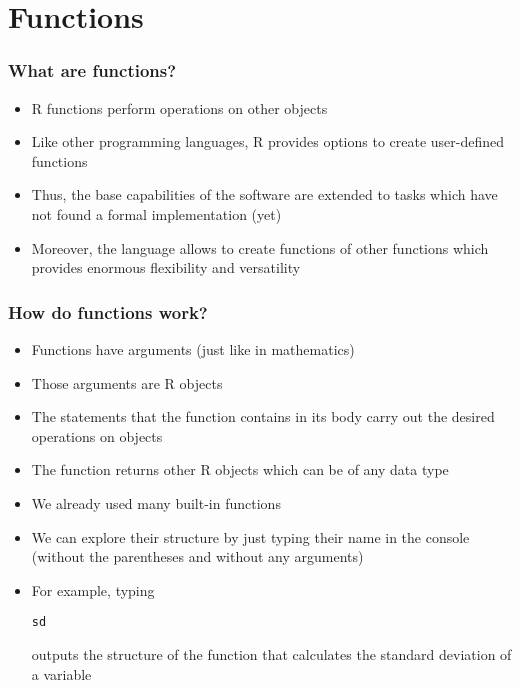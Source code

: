 \documentclass[10pt]{beamer}
\theoremstyle{definition}
\begin{document}
\section{Functions}
\begin{frame}[fragile]
\frametitle{What are functions?}
\begin{itemize}
	\item R functions perform operations on other objects
	\item Like other programming languages, R provides options to create user-defined functions
	\item Thus, the base capabilities of the software are extended to tasks which have not found a formal implementation (yet)
	\item Moreover, the language allows to create functions of other functions which provides enormous flexibility and versatility
\end{itemize}
\end{frame}

\begin{frame}[fragile]
\frametitle{How do functions work?}
\begin{itemize}
	\item Functions have arguments (just like in mathematics)
	\item Those arguments are R objects
	\item The statements that the function contains in its body carry out the desired operations on objects
	\item The function returns other R objects which can be of any data type
	\item We already used many built-in functions
	\item We can explore their structure by just typing their name in the console (without the parentheses and without any arguments)
	\item For example, typing
	\begin{lstlisting}[style = rstyle, breaklines]
	sd
	\end{lstlisting}
	outputs the structure of the function that calculates the standard deviation of a variable
\end{itemize}
\end{frame}
\end{document}
